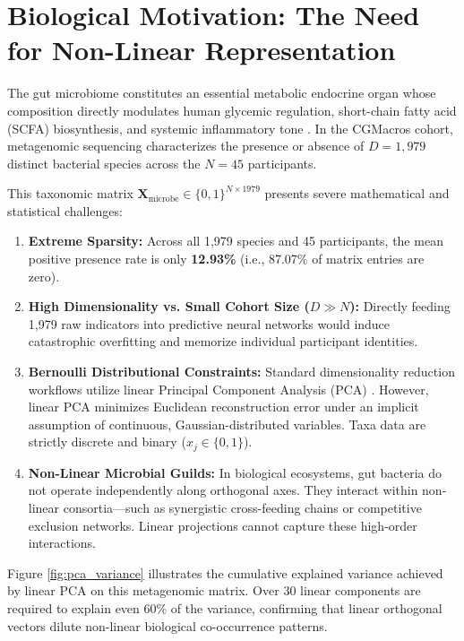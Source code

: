 \label{chap:microbiome_vae}

\section{Biological Motivation: The Need for Non-Linear Representation}
The gut microbiome constitutes an essential metabolic endocrine organ whose composition directly modulates human glycemic regulation, short-chain fatty acid (SCFA) biosynthesis, and systemic inflammatory tone \cite{turnbaugh2006obesity, canfora2015short}. In the CGMacros cohort, metagenomic sequencing characterizes the presence or absence of $D = 1,979$ distinct bacterial species across the $N = 45$ participants. 

This taxonomic matrix $\mathbf{X}_{\text{microbe}} \in \{0, 1\}^{N \times 1979}$ presents severe mathematical and statistical challenges:
\begin{enumerate}
    \item \textbf{Extreme Sparsity:} Across all 1,979 species and 45 participants, the mean positive presence rate is only \textbf{12.93\%} (i.e., 87.07\% of matrix entries are zero).
    \item \textbf{High Dimensionality vs. Small Cohort Size ($D \gg N$):} Directly feeding 1,979 raw indicators into predictive neural networks would induce catastrophic overfitting and memorize individual participant identities.
    \item \textbf{Bernoulli Distributional Constraints:} Standard dimensionality reduction workflows utilize linear Principal Component Analysis (PCA) \cite{zeevi2015personalized}. However, linear PCA minimizes Euclidean reconstruction error under an implicit assumption of continuous, Gaussian-distributed variables. Taxa data are strictly discrete and binary ($x_j \in \{0, 1\}$).
    \item \textbf{Non-Linear Microbial Guilds:} In biological ecosystems, gut bacteria do not operate independently along orthogonal axes. They interact within non-linear consortia—such as synergistic cross-feeding chains or competitive exclusion networks. Linear projections cannot capture these high-order interactions.
\end{enumerate}

Figure \ref{fig:pca_variance} illustrates the cumulative explained variance achieved by linear PCA on this metagenomic matrix. Over 30 linear components are required to explain even 60\% of the variance, confirming that linear orthogonal vectors dilute non-linear biological co-occurrence patterns.

